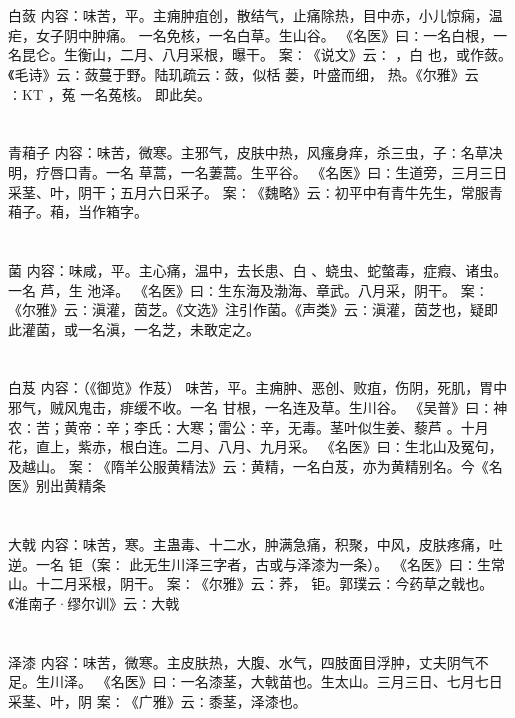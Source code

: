 \documentclass[12pt,UTF8]{ctexbook}
\begin{document}
\chapter{}白蔹
内容：味苦，平。主痈肿疽创，散结气，止痛除热，目中赤，小儿惊痫，温疟，女子阴中肿痛。 
一名免核，一名白草。生山谷。 
《名医》曰∶一名白根，一名昆仑。生衡山，二月、八月采根，曝干。 
案∶《说文》云∶ ，白 也，或作蔹。《毛诗》云∶蔹蔓于野。陆玑疏云∶蔹，似栝 
蒌，叶盛而细， 
热。《尔雅》云∶KT ，菟 
一名菟核。 
即此矣。 


\chapter{}青葙子
内容：味苦，微寒。主邪气，皮肤中热，风瘙身痒，杀三虫，子∶名草决明，疗唇口青。一名 
草蒿，一名萋蒿。生平谷。 
《名医》曰∶生道旁，三月三日采茎、叶，阴干；五月六日采子。 
案∶《魏略》云∶初平中有青牛先生，常服青葙子。葙，当作箱字。 


\chapter{}菌
内容：味咸，平。主心痛，温中，去长患、白 、蛲虫、蛇螫毒，症瘕、诸虫。一名 芦，生 
池泽。 
《名医》曰∶生东海及渤海、章武。八月采，阴干。 
案∶《尔雅》云∶滇灌，茵芝。《文选》注引作菌。《声类》云∶滇灌，茵芝也，疑即 
此灌菌，或一名滇，一名芝，未敢定之。 


\chapter{}白芨
内容：（《御览》作芨） 
味苦，平。主痈肿、恶创、败疽，伤阴，死肌，胃中邪气，贼风鬼击，痱缓不收。一名 
甘根，一名连及草。生川谷。 
《吴普》曰∶神农∶苦；黄帝∶辛；李氏∶大寒；雷公∶辛，无毒。茎叶似生姜、藜芦 
。十月花，直上，紫赤，根白连。二月、八月、九月采。 
《名医》曰∶生北山及冤句，及越山。 
案∶《隋羊公服黄精法》云∶黄精，一名白芨，亦为黄精别名。今《名医》别出黄精条 


\chapter{}大戟
内容：味苦，寒。主蛊毒、十二水，肿满急痛，积聚，中风，皮肤疼痛，吐逆。一名 钜（案∶ 
此无生川泽三字者，古或与泽漆为一条）。 
《名医》曰∶生常山。十二月采根，阴干。 
案∶《尔雅》云∶荞， 钜。郭璞云∶今药草之戟也。《淮南子·缪尔训》云∶大戟 


\chapter{}泽漆
内容：味苦，微寒。主皮肤热，大腹、水气，四肢面目浮肿，丈夫阴气不足。生川泽。 
《名医》曰∶一名漆茎，大戟苗也。生太山。三月三日、七月七日采茎、叶，阴 
案∶《广雅》云∶黍茎，泽漆也。 
\end{document}
